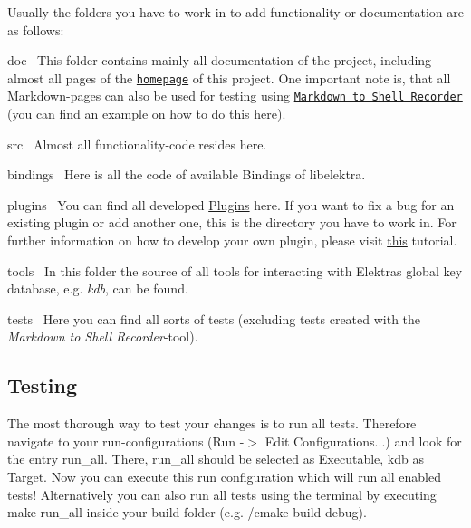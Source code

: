 Usually the folders you have to work in to add functionality or documentation are as follows\+:


\begin{DoxyItemize}
\item doc~\newline
 This folder contains mainly all documentation of the project, including almost all pages of the \href{https://www.libelektra.org}{\tt homepage} of this project. One important note is, that all Markdown-\/pages can also be used for testing using \href{https://github.com/ElektraInitiative/libelektra/tree/master/tests/shell/shell_recorder/tutorial_wrapper}{\tt Markdown to Shell Recorder} (you can find an example on how to do this \hyperlink{doc_help_kdb-get_md}{here}).
\item src~\newline
 Almost all functionality-\/code resides here.
\begin{DoxyItemize}
\item bindings~\newline
 Here is all the code of available Bindings of libelektra.
\item plugins~\newline
 You can find all developed \hyperlink{src_plugins_README_md}{Plugins} here. If you want to fix a bug for an existing plugin or add another one, this is the directory you have to work in. For further information on how to develop your own plugin, please visit \hyperlink{doc_tutorials_plugins_md}{this} tutorial.
\item tools~\newline
 In this folder the source of all tools for interacting with Elektra\textquotesingle{}s global key database, e.\+g. {\itshape kdb}, can be found.
\end{DoxyItemize}
\item tests~\newline
 Here you can find all sorts of tests (excluding tests created with the {\itshape Markdown to Shell Recorder}-\/tool).
\end{DoxyItemize}

\subsection*{Testing}

The most thorough way to test your changes is to run all tests. Therefore navigate to your run-\/configurations (Run -\/$>$ Edit Configurations...) and look for the entry {\ttfamily run\+\_\+all}. There, {\ttfamily run\+\_\+all} should be selected as {\ttfamily Executable}, {\ttfamily kdb} as {\ttfamily Target}. Now you can execute this run configuration which will run all enabled tests! Alternatively you can also run all tests using the terminal by executing {\ttfamily make run\+\_\+all} inside your build folder (e.\+g. /cmake-\/build-\/debug).

